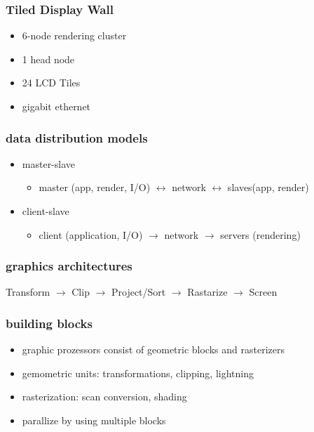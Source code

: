 \documentclass[11pt,a4paper]{article}
\begin{document}
\subsubsection{Tiled Display Wall}
\begin{itemize}
	\item 6-node rendering cluster
	\item 1 head node
	\item 24 LCD Tiles
	\item gigabit ethernet
\end{itemize}
\subsubsection{data distribution models}
\begin{itemize}
	\item master-slave
	\begin{itemize}
		\item master (app, render, I/O) $\leftrightarrow$ network $\leftrightarrow$ slaves(app, render)
	\end{itemize}
	\item client-slave
	\begin{itemize}
		\item client (application, I/O) $\rightarrow$ network $\rightarrow$ servers (rendering)
	\end{itemize}
\end{itemize}
\subsubsection{graphics architectures}
Transform $\rightarrow$ Clip  $\rightarrow$ Project/Sort  $\rightarrow$ Rastarize  $\rightarrow$ Screen
\subsubsection{building blocks}
\begin{itemize}
	\item graphic prozessors consist of geometric blocks and rasterizers
	\item gemometric units: transformations, clipping, lightning
	\item rasterization: scan conversion, shading
	\item parallize by using multiple blocks
\end{itemize}
\end{document}
